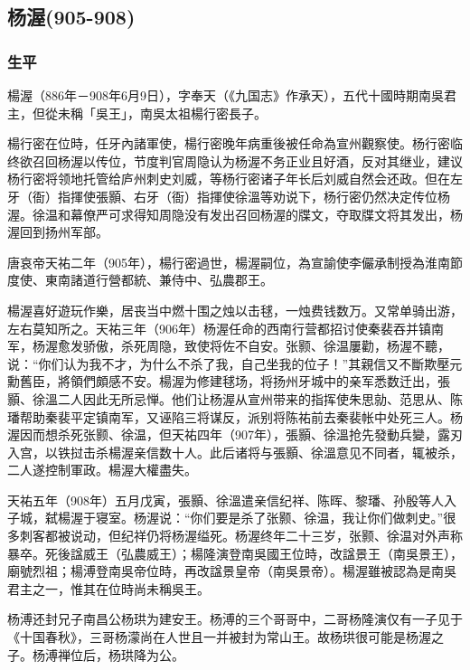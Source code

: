 
\subsection{杨渥\tiny(905-908)}

\subsubsection{生平}

楊渥（886年－908年6月9日），字奉天（《九国志》作承天），五代十國時期南吳君主，但從未稱「吳王」，南吳太祖楊行密長子。

楊行密在位時，任牙內諸軍使，楊行密晚年病重後被任命為宣州觀察使。杨行密临终欲召回杨渥以传位，节度判官周隐认为杨渥不务正业且好酒，反对其继业，建议杨行密将领地托管给庐州刺史刘威，等杨行密诸子年长后刘威自然会还政。但在左牙（衙）指揮使張顥、右牙（衙）指揮使徐溫等劝说下，杨行密仍然决定传位杨渥。徐温和幕僚严可求得知周隐没有发出召回杨渥的牒文，夺取牒文将其发出，杨渥回到扬州军部。

唐哀帝天祐二年（905年），楊行密過世，楊渥嗣位，為宣諭使李儼承制授為淮南節度使、東南諸道行營都統、兼侍中、弘農郡王。

楊渥喜好遊玩作樂，居丧当中燃十围之烛以击毬，一烛费钱数万。又常单骑出游，左右莫知所之。天祐三年（906年）杨渥任命的西南行营都招讨使秦裴吞并镇南军，杨渥愈发骄傲，杀死周隐，致使将佐不自安。张颢、徐温屢勸，杨渥不聽，说：“你们认为我不才，为什么不杀了我，自己坐我的位子！”其親信又不斷欺壓元勳舊臣，將領們頗感不安。楊渥为修建毬场，将扬州牙城中的亲军悉数迁出，張顥、徐溫二人因此无所忌惮。他们让杨渥从宣州带来的指挥使朱思勍、范思从、陈璠帮助秦裴平定镇南军，又诬陷三将谋反，派别将陈祐前去秦裴帐中处死三人。杨渥因而想杀死张颢、徐温，但天祐四年（907年），張顥、徐溫抢先發動兵變，露刃入宫，以铁挝击杀楊渥亲信数十人。此后诸将与張顥、徐溫意见不同者，辄被杀，二人遂控制軍政。楊渥大權盡失。

天祐五年（908年）五月戊寅，張顥、徐溫遣亲信纪祥、陈晖、黎璠、孙殷等人入子城，弑楊渥于寝室。杨渥说：“你们要是杀了张颢、徐温，我让你们做刺史。”很多刺客都被说动，但纪祥仍将杨渥缢死。杨渥终年二十三岁，张颢、徐温对外声称暴卒。死後諡威王（弘農威王）；楊隆演登南吳國王位時，改諡景王（南吳景王），廟號烈祖；楊溥登南吳帝位時，再改諡景皇帝（南吳景帝）。楊渥雖被認為是南吳君主之一，惟其在位時尚未稱吳王。

杨溥还封兄子南昌公杨珙为建安王。杨溥的三个哥哥中，二哥杨隆演仅有一子见于《十国春秋》，三哥杨濛尚在人世且一并被封为常山王。故杨珙很可能是杨渥之子。杨溥禅位后，杨珙降为公。


